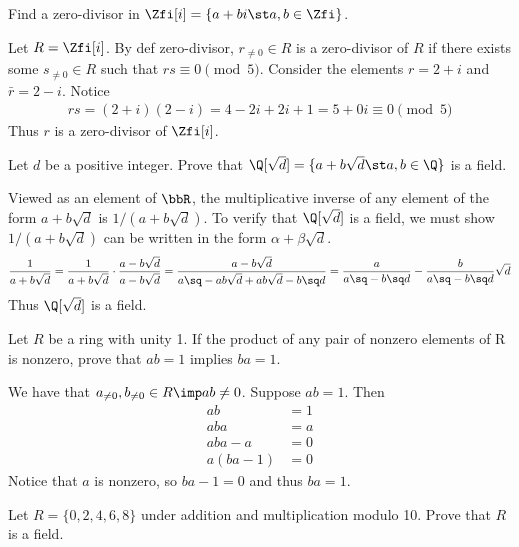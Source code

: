 \documentclass{article}
\begin{document}
Find a zero-divisor in \( \Zfi[i] = \{a+bi\st a,b\in\Zfi\} \).

\begin{solution} %
  Let \( R = \Zfi[i] \). By def zero-divisor, \( r_{\neq 0}\in R \) is a zero-divisor of \( R \) if there exists some \( s_{\neq 0}\in R \) such that \( rs \equiv 0 \pmod 5 \). Consider the elements \( r = 2+i \) and \( \bar{r} = 2-i \). Notice
  \begin{align*}
    rs = (2+i)(2-i) = 4 -2i + 2i + 1 = 5 + 0i \equiv 0 \pmod 5
  \end{align*}
  Thus \( r \) is a zero-divisor of \( \Zfi[i] \).
\end{solution}

Let \( d \) be a positive integer. Prove that \( \Q[\sqrt d] = \{a + b\sqrt d\st a,b\in\Q\}\) is a field.

\begin{solution} %
  Viewed as an element of \( \bbR \), the multiplicative inverse of any element of the form \( a+b\sqrt d \) is \( 1/(a+b\sqrt d) \). To verify that \( \Q[\sqrt d] \) is a field, we must show \( 1/(a+b\sqrt d) \) can be written in the form \( \alpha+\beta\sqrt d \).
  \begin{align*}
    \frac{1}{a+b\sqrt d} = \frac{1}{a+b\sqrt d} \cdot \frac{a-b\sqrt d}{a-b\sqrt d} = \frac{a-b\sqrt{d}}{a\sq -ab\sqrt{d} + ab \sqrt{d} - b\sq d} = \frac{a}{a\sq-b\sq d} - \frac{b}{a\sq-b\sq d}\sqrt{d}
  \end{align*}
  Thus \( \Q[\sqrt{d}] \) is a field.
\end{solution}

Let \( R \) be a ring with unity 1. If the product of any pair of nonzero elements of R is nonzero, prove that \( ab=1 \) implies \( ba=1 \).

\begin{solution} %
  We have that \( a_{\neq 0}, b_{\neq 0}\in R \imp ab \neq 0 \). Suppose \( ab = 1 \). Then \begin{align*}
    ab &= 1 \\
    aba &= a \\
    aba - a &= 0 \\
    a(ba - 1) &= 0
  \end{align*}
    Notice that \( a \) is nonzero, so \( ba - 1 = 0 \) and thus \( ba = 1 \).
\end{solution}

Let \( R = \{0, 2, 4, 6, 8\} \) under addition and multiplication modulo 10. Prove that \( R \) is a field.
\end{document}
